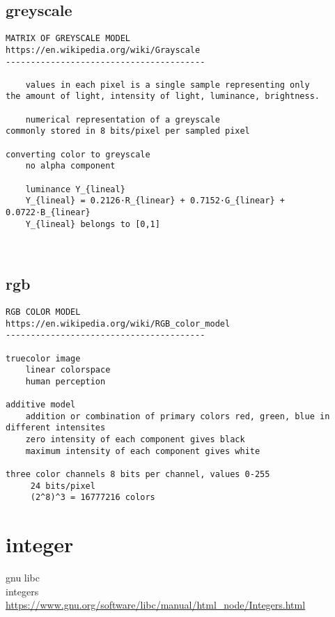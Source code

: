 \section{greyscale}
\begin{verbatim}
MATRIX OF GREYSCALE MODEL
https://en.wikipedia.org/wiki/Grayscale
----------------------------------------

    values in each pixel is a single sample representing only
the amount of light, intensity of light, luminance, brightness.

    numerical representation of a greyscale
commonly stored in 8 bits/pixel per sampled pixel

converting color to greyscale
    no alpha component

    luminance Y_{lineal}
    Y_{lineal} = 0.2126·R_{linear} + 0.7152·G_{linear} + 0.0722·B_{linear}
    Y_{lineal} belongs to [0,1]



\end{verbatim}

\section{rgb}
\begin{verbatim}
RGB COLOR MODEL
https://en.wikipedia.org/wiki/RGB_color_model
----------------------------------------

truecolor image
    linear colorspace
    human perception

additive model
    addition or combination of primary colors red, green, blue in different intensites
    zero intensity of each component gives black
    maximum intensity of each component gives white

three color channels 8 bits per channel, values 0-255 
     24 bits/pixel
     (2^8)^3 = 16777216 colors
\end{verbatim}



\chapter{integer}
\noindent gnu libc\\
integers\\
\url{https://www.gnu.org/software/libc/manual/html\_node/Integers.html}\\

